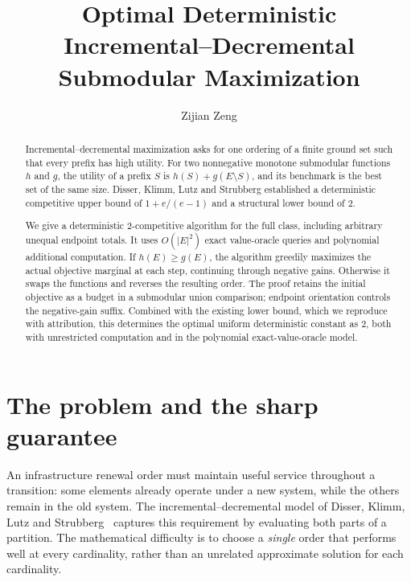 \documentclass[acmsmall,screen,nonacm,11pt,natbib=false]{acmart}
\title{Optimal Deterministic Incremental--Decremental Submodular Maximization}
\author{Zijian Zeng}
\affiliation{\institution{UCSI University}\country{Malaysia}}
\date{}
\begin{document}
\begin{abstract}
\normalsize
Incremental--decremental maximization asks for one ordering of a finite ground
set such that every prefix has high utility. For two nonnegative monotone
submodular functions $h$ and $g$, the utility of a prefix $S$ is
$h(S)+g(E\setminus S)$, and its benchmark is the best set of the same size.
Disser, Klimm, Lutz and Strubberg established a deterministic competitive
upper bound of $1+e/(e-1)$ and a structural lower bound of $2$.

We give a deterministic $2$-competitive algorithm for the full class,
including arbitrary unequal endpoint totals. It uses $O(|E|^2)$ exact
value-oracle queries and polynomial additional computation. If $h(E)\ge g(E)$,
the algorithm greedily maximizes the actual objective marginal at each step,
continuing through negative gains. Otherwise it swaps the functions and
reverses the resulting order. The proof retains the initial objective as a
budget in a submodular union comparison; endpoint orientation controls the
negative-gain suffix. Combined with the existing lower bound, which we
reproduce with attribution, this determines the optimal uniform deterministic
constant as $2$, both with unrestricted computation and in the polynomial
exact-value-oracle model.
\end{abstract}
\maketitle
\clearpage

\section{The problem and the sharp guarantee}

An infrastructure renewal order must maintain useful service throughout a
transition: some elements already operate under a new system, while the
others remain in the old system. The incremental--decremental model of
Disser, Klimm, Lutz and Strubberg~\cite{DKLS26} captures this requirement
by evaluating both parts of a partition. The mathematical difficulty is to
choose a \emph{single} order that performs well at every cardinality,
rather than an unrelated approximate solution for each cardinality.
\end{document}
